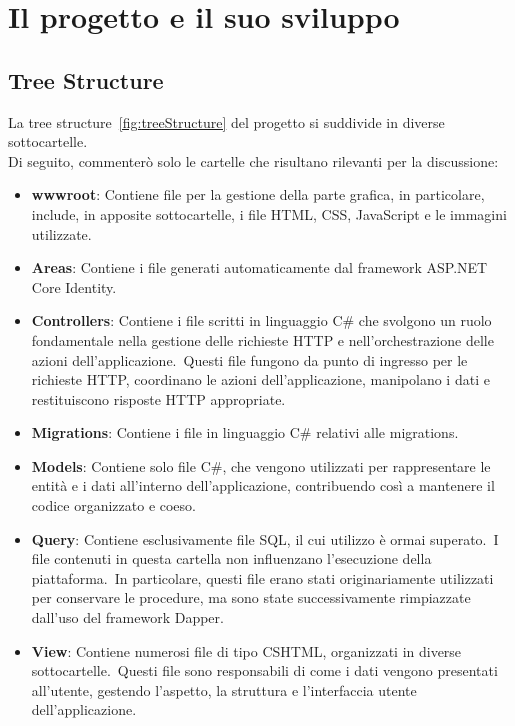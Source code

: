 \chapter{Il progetto e il suo sviluppo}\label{chapter:formattazione}
%
\section{Tree Structure}\label{sec:cap_sec_subsec}

La tree structure~\ref{fig:treeStructure} del progetto si suddivide in diverse sottocartelle.\\ 
Di seguito, commenterò solo le cartelle che risultano rilevanti per la discussione:
\begin{itemize}
	\item \textbf{wwwroot}: Contiene file per la gestione della parte grafica, 
	in particolare, include, in apposite sottocartelle, i file HTML, CSS, JavaScript e le immagini utilizzate. 
	\item \textbf{Areas}: Contiene i file generati automaticamente dal framework ASP.NET Core Identity.
	\item \textbf{Controllers}: Contiene i file scritti in linguaggio C\# che svolgono un 
	ruolo fondamentale nella gestione delle richieste HTTP e nell'orchestrazione 
	delle azioni dell'applicazione.\ Questi file fungono da punto di ingresso per 
	le richieste HTTP, coordinano le azioni dell'applicazione, manipolano i dati e 
	restituiscono risposte HTTP appropriate.
	\item \textbf{Migrations}: Contiene i file in linguaggio C\# relativi alle migrations.
	\item \textbf{Models}: Contiene solo file C\#, che vengono utilizzati per rappresentare 
	le entità e i dati all'interno dell'applicazione, contribuendo così a mantenere il 
	codice organizzato e coeso.
	\item \textbf{Query}: Contiene esclusivamente file SQL, il cui utilizzo è ormai superato.\ 
	I file contenuti in questa cartella non influenzano l'esecuzione della piattaforma.\
	In particolare, questi file erano stati originariamente utilizzati per conservare le procedure, 
	ma sono state successivamente rimpiazzate dall'uso del framework Dapper. 
	\item \textbf{View}: Contiene numerosi file di tipo CSHTML, organizzati in diverse 
	sottocartelle.\ Questi file sono responsabili di come i dati vengono presentati 
	all'utente, gestendo l'aspetto, la struttura e l'interfaccia utente dell'applicazione.
\end{itemize}
